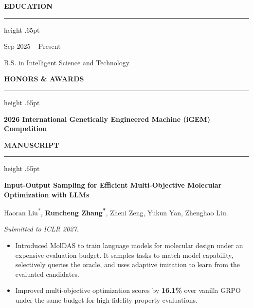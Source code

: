\documentclass{resume}
\renewenvironment{rSection}[1]{%
 \par\vspace{8.5pt plus 3pt}\noindent\Needspace*{3\baselineskip}%
 {\color{TsinghuaPurple}\bfseries\normalsize\MakeUppercase{#1}}\par\vspace{4pt}%
 {\color{CVRule}\hrule height .65pt}\vspace{6pt}%
}{\vspace{1pt plus 1pt}}
\begin{document}
\thispagestyle{fancy}

\begin{rSection}{Education}
\hfill{\color{CVMuted}\small Sep 2025 -- Present}\par
B.S. in Intelligent Science and Technology
\end{rSection}

\begin{rSection}{Honors \& Awards}
\noindent\textbf{2026 International Genetically Engineered Machine (iGEM) Competition}\par\vspace{3pt}
\par\vspace{3pt}
\end{rSection}

\begin{rSection}{Manuscript}
\noindent\textbf{Input-Output Sampling for Efficient Multi-Objective Molecular Optimization with LLMs}\par\vspace{3pt}
Haoran Liu\textsuperscript{*}, \textbf{Runcheng Zhang\textsuperscript{*}}, Zheni Zeng, Yukun Yan, Zhenghao Liu.\par\vspace{2pt}
\textit{Submitted to ICLR 2027.}\par\vspace{2pt}
\begin{itemize}[leftmargin=1.16em,topsep=2.7pt,itemsep=2.5pt,parsep=0pt]
\small
\item Introduced MolDAS to train language models for molecular design under an expensive evaluation budget. It samples tasks to match model capability, selectively queries the oracle, and uses adaptive imitation to learn from the evaluated candidates.
\item Improved multi-objective optimization scores by \textbf{16.1\%} over vanilla GRPO under the same budget for high-fidelity property evaluations.
\end{itemize}
\end{rSection}
\end{document}
